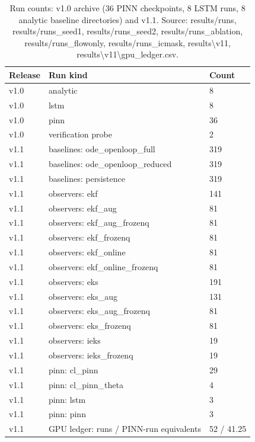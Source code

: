 \begin{table}[t]
\centering
\caption{Run counts: v1.0 archive (36 PINN checkpoints, 8 LSTM runs, 8 analytic baseline directories) and v1.1. Source: results/runs, results/runs\_seed1, results/runs\_seed2, results/runs\_ablation, results/runs\_flowonly, results/runs\_icmask, results\textbackslash{}v11, results\textbackslash{}v11\textbackslash{}gpu\_ledger.csv.}
\label{tab:si-counts}
\footnotesize
\begin{tabular}{lll}
\toprule
Release & Run kind & Count \\
\midrule
v1.0 & analytic & 8 \\
v1.0 & lstm & 8 \\
v1.0 & pinn & 36 \\
v1.0 & verification probe & 2 \\
v1.1 & baselines: ode\_openloop\_full & 319 \\
v1.1 & baselines: ode\_openloop\_reduced & 319 \\
v1.1 & baselines: persistence & 319 \\
v1.1 & observers: ekf & 141 \\
v1.1 & observers: ekf\_aug & 81 \\
v1.1 & observers: ekf\_aug\_frozenq & 81 \\
v1.1 & observers: ekf\_frozenq & 81 \\
v1.1 & observers: ekf\_online & 81 \\
v1.1 & observers: ekf\_online\_frozenq & 81 \\
v1.1 & observers: eks & 191 \\
v1.1 & observers: eks\_aug & 131 \\
v1.1 & observers: eks\_aug\_frozenq & 81 \\
v1.1 & observers: eks\_frozenq & 81 \\
v1.1 & observers: ieks & 19 \\
v1.1 & observers: ieks\_frozenq & 19 \\
v1.1 & pinn: cl\_pinn & 29 \\
v1.1 & pinn: cl\_pinn\_theta & 4 \\
v1.1 & pinn: lstm & 3 \\
v1.1 & pinn: pinn & 3 \\
v1.1 & GPU ledger: runs / PINN-run equivalents & 52 / 41.25 \\
\bottomrule
\end{tabular}
\end{table}
